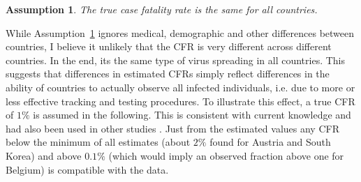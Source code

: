 \documentclass[fullpage,a4paper]{article}
\newcommand{\hyp}[1]{Assumption~\ref{hyp:#1}}
\newtheorem{hypothesis}{Assumption}
\begin{document}
\begin{hypothesis}
  \label{hyp:cfr}
  The true case fatality rate is the same for all countries.
\end{hypothesis}

While \hyp{cfr} ignores medical, demographic and other differences
between countries, I believe it unlikely that the CFR is very
different across different countries. In the end, its the same type of
virus spreading in all countries. This suggests that differences in
estimated CFRs simply reflect differences in the ability of countries
to actually observe all infected individuals, i.e. due to more or less
effective tracking and testing procedures. To illustrate this effect,
a true CFR of $1\%$ is assumed in the following. This is consistent
with current knowledge and had also been used in other studies
\cite{imperial2}. Just from the estimated values any CFR below the
minimum of all estimates (about $2\%$ found for Austria and South
Korea) and above $0.1\%$ (which would imply an observed fraction above
one for Belgium) is compatible with the data.
\end{document}
